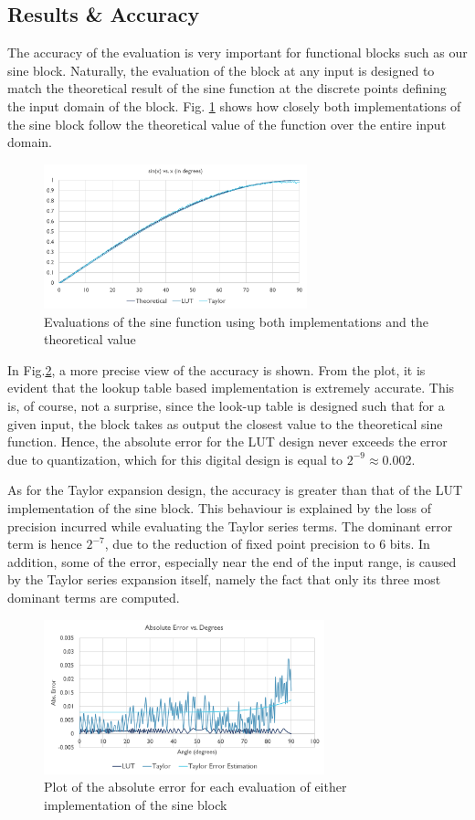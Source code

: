 \documentclass[10pt,journal]{IEEEtran}
\begin{document}
\subsection{Results \& Accuracy}
The accuracy of the evaluation is very important for functional blocks such as our sine block. Naturally, the evaluation of the block at any input is designed to match the theoretical result of the sine function at the discrete points defining the input domain of the block. Fig. \ref{results} shows how closely both implementations of the sine block follow the theoretical value of the function over the entire input domain.
\begin{figure}[h]
\centering
\includegraphics[width=3in]{results.png}
\caption{Evaluations of the sine function using both implementations and the theoretical value}
\label{results}
\end{figure}

In Fig.\ref{errors}, a more precise view of the accuracy is shown. From the plot, it is evident that the lookup table based implementation is extremely accurate. This is, of course, not a surprise, since the look-up table is designed such that for a given input, the block takes as output the closest value to the theoretical sine function. Hence, the absolute error for the LUT design never exceeds the error due to quantization, which for this digital design is equal to $2^{-9} \approx 0.002$.

As for the Taylor expansion design, the accuracy is greater than that of the LUT implementation of the sine block. This behaviour is explained by the loss of precision incurred while evaluating the Taylor series terms. The dominant error term is hence $2^{-7}$, due to the reduction of fixed point precision to 6 bits. In addition, some of the error, especially near the end of the input range, is caused by the Taylor series expansion itself, namely the fact that only its three most dominant terms are computed.

\begin{figure}[h]
\centering
\includegraphics[width=3.2in]{errors.png}
\caption{Plot of the absolute error for each evaluation of either implementation of the sine block}
\label{errors}
\end{figure}
\end{document}
